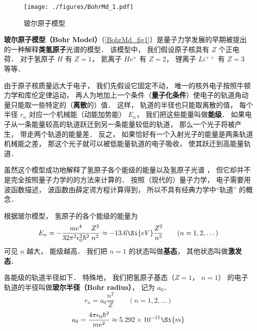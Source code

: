 

\begin{figure}[ht]
\centering
\texttt{[image: ./figures/BohrMd\_1.pdf]}
\caption{玻尔原子模型} \label{BohrMd_fig1}
\end{figure}

\textbf{玻尔原子模型（Bohr Model）}（\autoref{BohrMd_fig1}）是量子力学发展的早期被提出的一种解释\textbf{类氢原子}光谱的模型． 该模型中， 我们假设原子核具有 $Z$ 个正电荷． 对于氢原子 $H$ 有 $Z = 1$， 氦离子 $He^+$ 有 $Z = 2$， 锂离子 $Li^{++}$ 有 $Z = 3$ 等等．

由于原子核质量远大于电子， 我们先假设它固定不动， %
唯一的核外电子按照牛顿力学和库伦定律运动， 再人为地加上一个条件（\textbf{量子化条件}）使电子的轨道角动量只能取一些特定的（\textbf{离散}的）值． 这样， 轨道的半径也只能取离散的值， 每个半径 $r_n$ 对应一个机械能（动能加势能） $E_n$， 我们把这些能量叫做\textbf{能级}． 如果电子从一条能量较高的轨道跃迁到另一条能量较低的轨道， 那么一个光子将被产生， 带走两个轨道的能量差． 反之， 如果恰好有一个入射光子的能量是两条轨道机械能之差， 那这个光子就可以被低能量轨道的电子吸收， 使其跃迁到高能量轨道．

虽然这个模型成功地解释了氢原子各个能级的能量以及氢原子光谱%
， 但它却并不是完全按照量子力学的的方法来计算的． 按照（现代的）量子力学， 电子需要用波函数描述， 波函数由薛定谔方程计算得到， 所以不具有经典力学中“轨道” 的概念．

根据玻尔模型， 氢原子的各个能级的能量为
\begin{equation}
E_n =  - \frac{m e^4}{32 \pi^2 \epsilon_0^2 \hbar ^2} \frac{Z^2}{n^2} \approx - 13.6\Si{eV} \frac{Z^2}{n^2}
\qquad (n = 1, 2, \dots)
\end{equation}
可见 $n$ 越大， 能级越高． 我们把 $n = 1$ 的状态叫做\textbf{基态}， 其他状态叫做\textbf{激发态}． 

各能级的轨道半径如下． 特殊地， 我们把氢原子基态（$Z = 1$， $n = 1$） 的电子轨道的半径叫做\textbf{玻尔半径（Bohr radius）}， 记为 $a_0$．
\begin{equation}\label{BohrMd_eq1}
r_n = a_0 \frac{n^2}{Z}
\qquad (n = 1, 2, \dots)
\end{equation}
\begin{equation}
a_0 = \frac{4\pi \epsilon_0 \hbar^2}{m e^2} \approx 5.292\times 10^{-11}\Si{m}
\end{equation}


